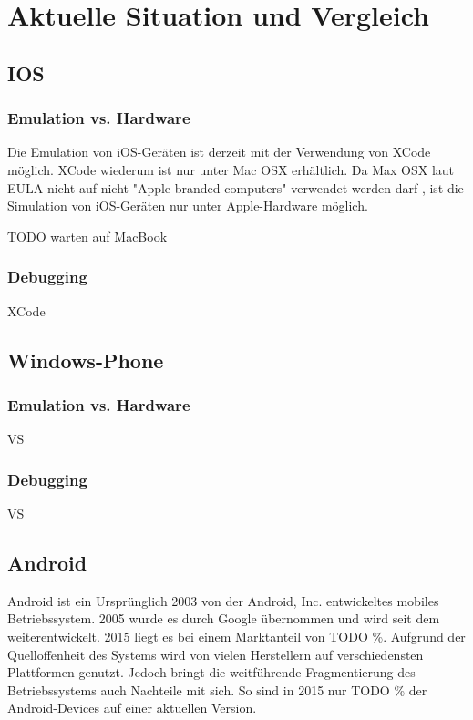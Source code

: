 \section{Aktuelle Situation und Vergleich}
		\subsection{IOS}
			\subsubsection{Emulation vs. Hardware}
			Die Emulation von iOS-Geräten ist derzeit mit der Verwendung von XCode möglich. XCode wiederum ist nur unter Mac OSX erhältlich. Da Max OSX laut EULA nicht auf nicht "Apple-branded computers" verwendet werden darf \cite{AppleEULA}, ist die Simulation von iOS-Geräten nur unter Apple-Hardware möglich.
			
TODO warten auf MacBook
			\subsubsection{Debugging}
			XCode
		\subsection{Windows-Phone}
			\subsubsection{Emulation vs. Hardware}
			VS
			\subsubsection{Debugging}
			VS	
		\subsection{Android}
			Android ist ein Ursprünglich 2003 von der Android, Inc. entwickeltes mobiles Betriebssystem. 2005 wurde es durch Google übernommen und wird seit dem weiterentwickelt. 2015 liegt es bei einem Marktanteil von TODO \%. Aufgrund der Quelloffenheit des Systems wird von vielen Herstellern auf verschiedensten Plattformen genutzt. Jedoch bringt die weitführende Fragmentierung des Betriebssystems auch Nachteile mit sich. So sind in 2015 nur TODO \% der Android-Devices auf einer aktuellen Version.\cite{Drake2014}
